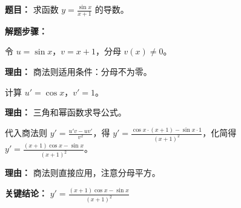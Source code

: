 \begin{examplebox}
	\textbf{\textcolor{CExample}{题目：}}
	求函数 $y=\frac{\sin x}{x+1}$ 的导数。

	\textbf{\textcolor{CExample}{解题步骤：}}
	\begin{description}[style=nextline, leftmargin=2.8em, labelsep=0.5em, itemsep=0.45em]
		\item[\textbf{第一步（识别分式）：}] 令 $u=\sin x$，$v=x+1$，分母 $v(x)\neq 0$。
			\par\textbf{理由：}
			商法则适用条件：分母不为零。
		\item[\textbf{第二步（分别求导）：}] 计算 $u'=\cos x$，$v'=1$。
			\par\textbf{理由：}
			三角和幂函数求导公式。
		\item[\textbf{第三步（套用商公式）：}] 代入商法则 $y'=\frac{u'v-uv'}{v^2}$，得 $y'=\frac{\cos x\cdot(x+1)-\sin x\cdot1}{(x+1)^2}$，化简得 $y'=\frac{(x+1)\cos x-\sin x}{(x+1)^2}$。
			\par\textbf{理由：}
			商法则直接应用，注意分母平方。
	\end{description}

	\textbf{\textcolor{CExample}{关键结论：}}
	\textbf{$y'=\frac{(x+1)\cos x-\sin x}{(x+1)^2}$}
\end{examplebox}
